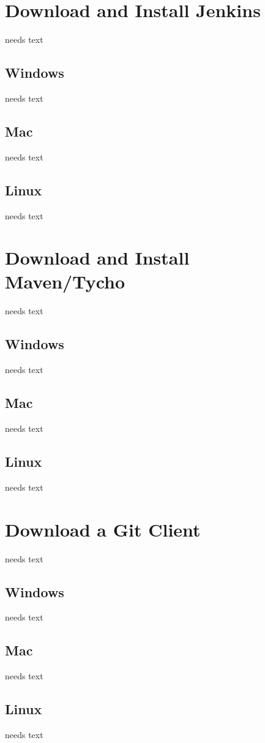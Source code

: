 \documentclass[a4paper,10pt,twoside]{book}
\begin{document}
\section{Download and Install Jenkins}
needs text

\subsection{Windows}
needs text

\subsection{Mac}
needs text

\subsection{Linux}
needs text

\section{Download and Install Maven/Tycho}
needs text

\subsection{Windows}
needs text

\subsection{Mac}
needs text

\subsection{Linux}
needs text

\section{Download a Git Client}
needs text

\subsection{Windows}
needs text

\subsection{Mac}
needs text

\subsection{Linux}
needs text


\ifx\wholebook\relax\else
   
   
\end{document}
